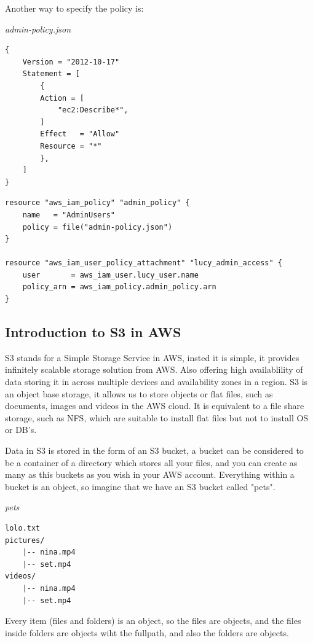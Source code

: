 \documentclass{article}
\newenvironment{codetemplate}[1][]{%
  \mybasecolorbox[#1]
  \itshape
}{%
  \endmybasecolorbox
}
\begin{document}
Another way to specify the policy is:

\begin{codetemplate}{admin-policy.json}
\begin{verbatim}
{
    Version = "2012-10-17"
    Statement = [
        {
        Action = [
            "ec2:Describe*",
        ]
        Effect   = "Allow"
        Resource = "*"
        },
    ]
}
\end{verbatim}
\end{codetemplate}
\begin{codetemplate}{}
\begin{verbatim}
resource "aws_iam_policy" "admin_policy" {
    name   = "AdminUsers"
    policy = file("admin-policy.json")
}

resource "aws_iam_user_policy_attachment" "lucy_admin_access" {
    user       = aws_iam_user.lucy_user.name
    policy_arn = aws_iam_policy.admin_policy.arn
}
\end{verbatim}
\end{codetemplate}

\subsection{Introduction to S3 in AWS}
S3 stands for a Simple Storage Service in AWS, insted it is simple, it provides infinitely scalable storage solution from AWS. Also offering high availablility of data storing it in across multiple devices and availability zones in a region. S3 is an object base storage, it allows us to store objects or flat files, such as documents, images and videos in the AWS cloud. It is equivalent to a file share storage, such as NFS, which are suitable to install flat files but not to install OS or DB's. 

Data in S3 is stored in the form of an S3 bucket, a bucket can be considered to be a container of a directory which stores all your files, and you can create as many as this buckets as you wish in your AWS account. Everything within a bucket is an object, so imagine that we have an S3 bucket called "pets".

\begin{codetemplate}{pets}
\begin{verbatim}
lolo.txt
pictures/
    |-- nina.mp4
    |-- set.mp4
videos/
    |-- nina.mp4
    |-- set.mp4
\end{verbatim}
\end{codetemplate}

Every item (files and folders) is an object, so the files are objects, and the files inside folders are objects wiht the fullpath, and also the folders are objects.
\end{document}
